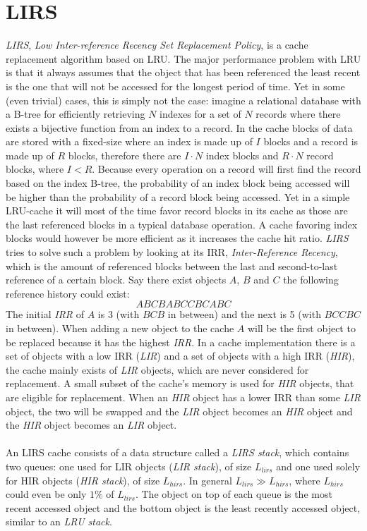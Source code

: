 \documentclass[pdftex,a4paper,12pt,twoside]{report}
\begin{document}
\section{LIRS}
\emph{LIRS}, \emph{Low Inter-reference Recency Set Replacement Policy}, is a cache replacement algorithm based on LRU. 
The major performance problem with LRU is that it always assumes that the object that has been referenced the least recent is the one that will not be accessed for the longest period of time. Yet in some (even trivial) cases, this is simply not the case: imagine a relational database with a B-tree for efficiently retrieving $N$ indexes for a set of $N$ records where there exists a bijective function from an index to a record. In the cache blocks of data are stored with a fixed-size where an index is made up of $I$ blocks and a record is made up of $R$ blocks, therefore there are $I \cdot N$ index blocks and $R \cdot N$ record blocks, where $I < R$. Because every operation on a record will first find the record based on the index B-tree, the probability of an index block being accessed will be higher than the probability of a record block being accessed. Yet in a simple LRU-cache it will most of the time favor record blocks in its cache as those are the last referenced blocks in a typical database operation. A cache favoring index blocks would however be more efficient as it increases the cache hit ratio. \emph{LIRS} tries to solve such a problem by looking at its IRR, \emph{Inter-Reference Recency}, which is the amount of referenced blocks between the last and second-to-last reference of a certain block. Say there exist objects $A$, $B$ and $C$ the following reference history could exist:
\[ABCBABCCBCABC\]
The initial \emph{IRR} of $A$ is 3 (with $BCB$ in between) and the next is 5 (with $BCCBC$ in between). When adding a new object to the cache $A$ will be the first object to be replaced because it has the highest \emph{IRR}. In a cache implementation there is a set of objects with a low IRR (\emph{LIR}) and a set of objects with a high IRR (\emph{HIR}), the cache mainly exists of \emph{LIR} objects, which are never considered for replacement. A small subset of the cache's memory is used for \emph{HIR} objects, that are eligible for replacement. When an \emph{HIR} object has a lower IRR than some \emph{LIR} object, the two will be swapped and the \emph{LIR} object becomes an \emph{HIR} object and the \emph{HIR} object becomes an \emph{LIR} object.
\\\\
An LIRS cache consists of a data structure called a \emph{LIRS stack}, which contains two queues: one used for LIR objects (\emph{LIR stack}), of size $L_{lirs}$ and one used solely for HIR objects (\emph{HIR stack}), of size $L_{hirs}$. In general $L_{lirs} \gg L_{hirs}$, where $L_{hirs}$ could even be only $1\%$ of $L_{lirs}$. The object on top of each queue is the most recent accessed object and the bottom object is the least recently accessed object, similar to an \emph{LRU stack}.
\end{document}
